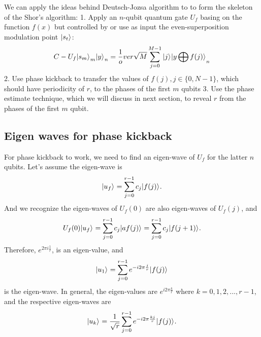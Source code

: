 \documentclass{ctexbook}
\begin{document}
We can apply the ideas behind Deutsch-Jozsa algorithm to to form the skeleton of the Shor's algorithm:
1. Apply an $n$-qubit quantum gate $U_f$ basing on the function $f(x)$ but controlled by or use as input the even-superposition modulation point $\vert {s_t} \rangle_{}$:
\begin{equation}
    C-U_f{\vert {s_m} \rangle_{}}_m {\vert {y} \rangle_{}}_n = \frac 1 over \sqrt {M} \sum^{M-1}_{j=0} \vert {j} \rangle_{} {\vert {y\bigoplus f(j)} \rangle_{}}_n
\end{equation}
2. Use phase kickback to transfer the values of $f(j), j\in \{0,N-1\}$, which should have periodicity of $r$, to the phases of the first $m$ qubits
3. Use the phase estimate technique, which we will discuss in next section, to reveal $r$ from the phases of the first $m$ qubit.

\subsection{Eigen waves for phase kickback}
For phase kickback to work, we need to find an eigen-wave of $U_f$ for the latter $n$ qubits. Let's assume the eigen-wave is
\begin{equation}\label{keta_u}
    \vert {u_f} \rangle_{} = \sum^{r-1}_{j=0} c_j \vert {f(j)} \rangle_{}.
\end{equation}
And we recognize the eigen-waves of $U_f(0)$ are also eigen-waves of $U_f(j)$, and
\begin{equation}\label{Uketa_u}
U_f(0) \vert {u_f} \rangle_{} = \sum^{r-1}_{j=0} c_j \vert {a f(j)} \rangle_{}= \sum^{r-1}_{j=0} c_j \vert { f(j+1)} \rangle_{}.
\end{equation}
Therefore, $e^{2\pi i \frac 1 r}$, is an eigen-value, and
\begin{equation}\label{keta_u1}
    \vert {u_1} \rangle_{} = \sum^{r-1}_{j=0} e^{-i 2\pi \frac j r} \vert {f(j)} \rangle_{}
\end{equation}
is the eigen-wave.
In general, the eigen-values are $e^{i 2\pi \frac k r}$ where $k=0, 1, 2, ..., r-1$, and the respective eigen-waves are
\begin{equation}\label{keta_uk}
    \vert {u_k} \rangle_{} = \frac 1 {\sqrt{r}} \sum^{r-1}_{j=0} e^{-i 2\pi \frac {kj} r} \vert {f(j)} \rangle_{}.
\end{equation}
\end{document}
